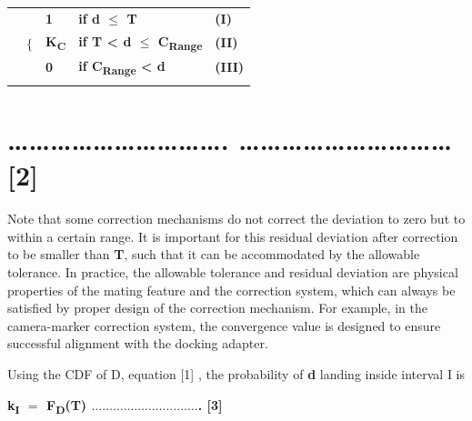 \documentclass[11pt]{book}
\begin{document}
\begin{table}[H]
\begin{adjustbox}{max width=\textwidth}
\begin{tabular}{p{1.64cm}p{0.74cm}p{1.27cm}p{3.55cm}p{1.53cm}}
\hhline{~~~~~}
\multicolumn{1}{p{1.64cm}}{\multirow{3}{*}{\parbox{1.64cm}{\centering
\textbf{S (d) $=$ }}}} & 
\multicolumn{1}{p{0.74cm}}{\multirow{3}{*}{\parbox{0.74cm}{\centering
{\fontsize{46pt}{55.2pt}\selectfont $\{$}}}} & 
\multicolumn{1}{p{1.27cm}}{\textbf{1}} & 
\multicolumn{1}{p{3.55cm}}{\textbf{if d $\leq$ T}} & 
\multicolumn{1}{p{1.53cm}}{\textbf{(I)}} \\ 
\hhline{~~~~~}
\multicolumn{1}{p{1.64cm}}{} & 
\multicolumn{1}{p{0.74cm}}{} & 
\multicolumn{1}{p{1.27cm}}{\textbf{K\textsubscript{C}}} & 
\multicolumn{1}{p{3.55cm}}{\textbf{if T < d $\leq$ C\textsubscript{Range }}} & 
\multicolumn{1}{p{1.53cm}}{\textbf{(II)}} \\ 
\hhline{~~~~~}
\multicolumn{1}{p{1.64cm}}{} & 
\multicolumn{1}{p{0.74cm}}{} & 
\multicolumn{1}{p{1.27cm}}{\textbf{0}} & 
\multicolumn{1}{p{3.55cm}}{\textbf{if C\textsubscript{Range} < d\textsubscript{ }}} & 
\multicolumn{1}{p{1.53cm}}{\textbf{(III)}} \\ 
\hhline{~~~~~}
\end{tabular}
\end{adjustbox}
\end{table}
\vspace{4\baselineskip}
\section{…………………………. ………………………… [2]}

Note that some correction mechanisms do not correct the deviation to zero but to within a certain range. It is important for this residual deviation after correction to be smaller than \textbf{T}, such that it can be accommodated by the allowable tolerance. In practice, the allowable tolerance and residual deviation are physical properties of the mating feature and the correction system, which can always be satisfied by proper design of the correction mechanism. For example, in the camera-marker correction system, the convergence value is designed to ensure successful alignment with the docking adapter.

Using the CDF of D, equation [1] , the probability of \textbf{d} landing inside interval I is 

\textbf{k\textsubscript{I} $=$ F\textsubscript{D}(T) $\ldots$$\ldots$$\ldots$$\ldots$$\ldots$$\ldots$$\ldots$$\ldots$$\ldots$$\ldots$. [3]}
\end{document}
